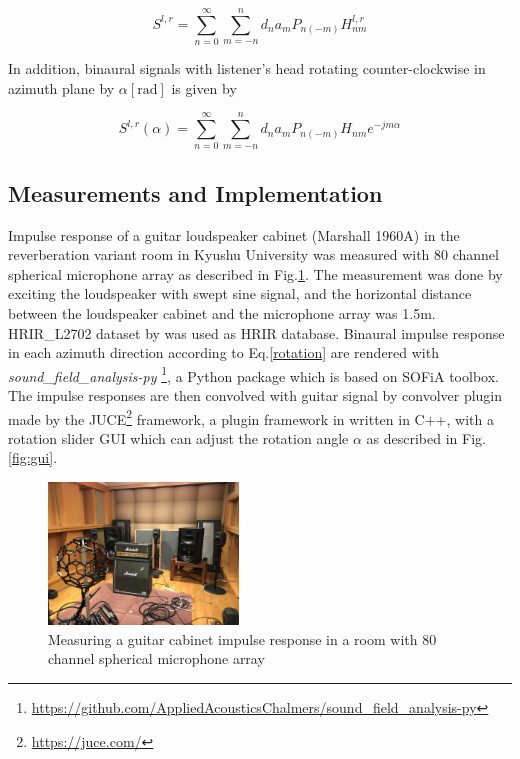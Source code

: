 \documentclass[convention,e-brief]{aesconf-current}
\begin{document}
\begin{equation}
    \label{binaural_signal}
    S^{l, r} =\sum_{n=0}^{\infty} \sum_{m=-n}^{n} d_{n} a_{m} P_{n(-m)} H_{n m}^{l,r}
\end{equation}

In addition, binaural signals with listener's head rotating counter-clockwise in azimuth plane by $\alpha[\mathrm{rad}]$ is given by

\begin{equation}
    \label{rotation}
    S^{l, r}(\alpha)=\sum_{n=0}^{\infty} \sum_{m=-n}^{n} d_{n} a_{m} P_{n(-m)} H_{n m} e^{-j m \alpha}
\end{equation}

\subsection{Measurements and Implementation}

Impulse response of a guitar loudspeaker cabinet (Marshall 1960A) in the reverberation variant room in Kyushu University was measured with 80 channel spherical microphone array as described in Fig.\ref{fig:fullerene}.
The measurement was done by exciting the loudspeaker with swept sine signal, and the horizontal distance between the loudspeaker cabinet and the microphone array was 1.5m.
HRIR\_L2702 dataset by \citet{Bernschutz2013-zy} was used as HRIR database.
Binaural impulse response in each azimuth direction according to Eq.\ref{rotation} are rendered with \emph{sound\_field\_analysis-py} \footnote{\url{https://github.com/AppliedAcousticsChalmers/sound_field_analysis-py}}, a Python package which is based on SOFiA toolbox\cite{Bernschutz2011-rj}.
The impulse responses are then convolved with guitar signal by convolver plugin made by the JUCE\footnote{\url{https://juce.com/}} framework, a plugin framework in written in C++, with a rotation slider GUI which can adjust the rotation angle $\alpha$ as described in Fig.\ref{fig:gui}.

\begin{figure}
    \centering
    \includegraphics[width=0.45\textwidth]{./fig/fullerene.jpg}
    \caption{Measuring a guitar cabinet impulse response in a room with 80 channel spherical microphone array}
    \label{fig:fullerene}
\end{figure}
\end{document}
